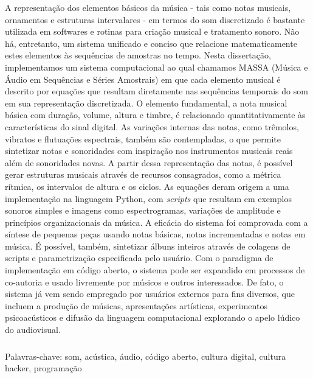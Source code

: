 \begin{resumo}

A representação dos elementos básicos da música - tais como notas musicais, ornamentos e estruturas intervalares - em termos do som discretizado é bastante utilizada em softwares e rotinas para criação musical e tratamento sonoro. Não há, entretanto, um sistema unificado e conciso que relacione matematicamente estes elementos às sequências de amostras no tempo. Nesta dissertação, implementamos um sistema computacional ao qual chamamos MASSA (Música e Áudio em Sequências e Séries Amostrais) em que cada elemento musical é descrito por equações que resultam diretamente nas sequências temporais do som em sua representação discretizada. O elemento fundamental, a nota musical básica com duração, volume, altura e timbre, é relacionado quantitativamente às características do sinal digital. As variações internas das notas, como trêmolos, vibratos e flutuações espectrais, também são contempladas, o que permite sintetizar notas e sonoridades com inspiração nos instrumentos musicais reais além de sonoridades novas. A partir dessa representação das notas, é possível gerar estruturas musicais através de recursos consagrados, como a métrica rítmica, os intervalos de altura e os ciclos. As equações deram origem a uma implementação na linguagem Python, com \emph{scripts} que resultam em exemplos sonoros simples e imagens como espectrogramas, variações de amplitude e princípios organizacionais da música. A eficácia do sistema foi comprovada com a síntese de pequenas peças usando notas básicas, notas incrementadas e notas em música. É possível, também, sintetizar álbuns inteiros através de colagens de scripts e parametrização especificada pelo usuário. Com o paradigma de implementação em código aberto, o sistema pode ser expandido em processos de co-autoria e usado livremente por músicos e outros interessados. De fato, o sistema já vem sendo empregado por usuários externos para fins diversos, que incluem a produção de músicas, apresentações artísticas, experimentos psicoacústicos e difusão da linguagem computacional explorando o apelo lúdico do audiovisual.


$\phantom{linha em branco}$\\
Palavras-chave: som, acústica, áudio, código aberto, cultura digital, cultura hacker, programação

\end{resumo}

